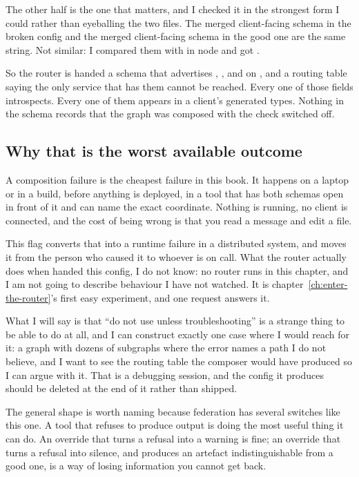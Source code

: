The other half is the one that matters, and I checked it in the strongest form I
could rather than eyeballing the two files. The merged client-facing schema in
the broken config and the merged client-facing schema in the good one are the
same string. Not similar: I compared them with \code{===} in node and got
.

So the router is handed a schema that advertises ,
,  and  on
, and a routing table saying the only service that has them cannot
be reached. Every one of those fields introspects. Every one of them appears in
a client's generated types. Nothing in the schema records that the graph was
composed with the check switched off.

\subsection*{Why that is the worst available outcome}

%
A composition failure is the cheapest failure in this book. It happens on a
laptop or in a build, before anything is deployed, in a tool that has both
schemas open in front of it and can name the exact coordinate. Nothing is
running, no client is connected, and the cost of being wrong is that you read a
message and edit a file.

This flag converts that into a runtime failure in a distributed system, and
moves it from the person who caused it to whoever is on call. What the router
actually does when handed this config, I do not know: no router runs in this
chapter, and I am not going to describe behaviour I have not watched. It is
chapter~\ref{ch:enter-the-router}'s first easy experiment, and one request
answers it.

%
What I will say is that \enquote{do not use unless troubleshooting} is a
strange thing to be able to do at all, and I can construct exactly one case
where I would reach for it: a graph with dozens of subgraphs where the error
names a path I do not believe, and I want to see the routing table the composer
would have produced so I can argue with it. That is a debugging session, and the
config it produces should be deleted at the end of it rather than shipped.

The general shape is worth naming because federation has several switches like
this one. A tool that refuses to produce output is doing the most useful thing
it can do. An override that turns a refusal into a warning is fine; an override
that turns a refusal into silence, and produces an artefact indistinguishable
from a good one, is a way of losing information you cannot get back.

